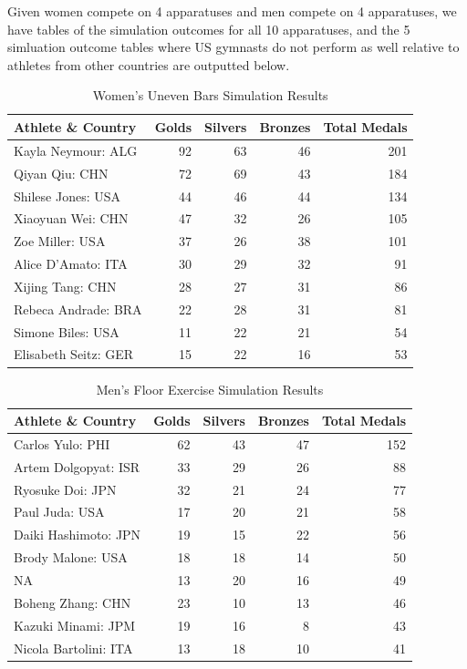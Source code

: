 \documentclass[
  letterpaper,
  DIV=11,
  numbers=noendperiod]{scrartcl}
\begin{document}
Given women compete on 4 apparatuses and men compete on 4 apparatuses,
we have tables of the simulation outcomes for all 10 apparatuses, and
the 5 simluation outcome tables where US gymnasts do not perform as well
relative to athletes from other countries are outputted below.

\begin{table}[H]

\caption{Women's Uneven Bars Simulation Results }
\centering
\fontsize{9}{11}\selectfont
\begin{tabular}[t]{l|r|r|r|r}
\hline
Athlete \& Country & Golds & Silvers & Bronzes & Total Medals\\
\hline
Kayla Neymour: ALG & 92 & 63 & 46 & 201\\
\hline
Qiyan Qiu: CHN & 72 & 69 & 43 & 184\\
\hline
Shilese Jones: USA & 44 & 46 & 44 & 134\\
\hline
Xiaoyuan Wei: CHN & 47 & 32 & 26 & 105\\
\hline
Zoe Miller: USA & 37 & 26 & 38 & 101\\
\hline
Alice D'Amato: ITA & 30 & 29 & 32 & 91\\
\hline
Xijing Tang: CHN & 28 & 27 & 31 & 86\\
\hline
Rebeca Andrade: BRA & 22 & 28 & 31 & 81\\
\hline
Simone Biles: USA & 11 & 22 & 21 & 54\\
\hline
Elisabeth Seitz: GER & 15 & 22 & 16 & 53\\
\hline
\end{tabular}
\end{table}

\begin{table}[H]

\caption{Men's Floor Exercise Simulation Results }
\centering
\fontsize{9}{11}\selectfont
\begin{tabular}[t]{l|r|r|r|r}
\hline
Athlete \& Country & Golds & Silvers & Bronzes & Total Medals\\
\hline
Carlos Yulo: PHI & 62 & 43 & 47 & 152\\
\hline
Artem Dolgopyat: ISR & 33 & 29 & 26 & 88\\
\hline
Ryosuke Doi: JPN & 32 & 21 & 24 & 77\\
\hline
Paul Juda: USA & 17 & 20 & 21 & 58\\
\hline
Daiki Hashimoto: JPN & 19 & 15 & 22 & 56\\
\hline
Brody Malone: USA & 18 & 18 & 14 & 50\\
\hline
NA & 13 & 20 & 16 & 49\\
\hline
Boheng Zhang: CHN & 23 & 10 & 13 & 46\\
\hline
Kazuki Minami: JPM & 19 & 16 & 8 & 43\\
\hline
Nicola Bartolini: ITA & 13 & 18 & 10 & 41\\
\hline
\end{tabular}
\end{table}
\end{document}
